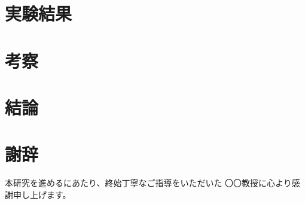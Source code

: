 \documentclass[12pt,a4paper,titlepage]{ltjsarticle}
\begin{document}
\section{実験結果}\label{sec:results}


\section{考察}\label{sec:discussion}


\section{結論}\label{sec:conclusion}


\section*{謝辞}

本研究を進めるにあたり、終始丁寧なご指導をいただいた
〇〇教授に心より感謝申し上げます。


\newpage
\printbibliography[title={参考文献}]

% 
%
% 
\end{document}
